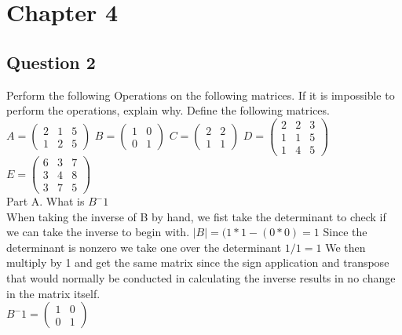 \documentclass[11pt]{article}
\begin{document}
\section{Chapter 4}

\subsection{Question 2}
Perform the following Operations on the following matrices. If it is impossible to perform the operations, explain why. Define the following matrices. \\

$A = \left( \begin{smallmatrix} 2&1&5\\ 1&2&5 \end{smallmatrix} \right)$
$B = \left( \begin{smallmatrix} 1&0\\0&1 \end{smallmatrix} \right)$
$C = \left( \begin{smallmatrix} 2&2\\1&1 \end{smallmatrix} \right)$
$D = \left( \begin{smallmatrix} 2&2&3\\1&1&5\\1&4&5 \end{smallmatrix} \right)$
$E = \left( \begin{smallmatrix} 6&3&7\\3&4&8\\3&7&5 \end{smallmatrix} \right)$\\

Part A. What is $B^-1$\\
	
When taking the inverse of B by hand, we fist take the determinant to check if we can take the inverse to begin with. $|B|=(1*1-(0*0)=1$ Since the determinant is nonzero we take one over the determinant $1/1=1$ We then multiply by 1 and get the same matrix since the sign application and transpose that would normally be conducted in calculating the inverse results in no change in the matrix itself.\\

$B^-1=\left( \begin{smallmatrix} 1&0\\0&1 \end{smallmatrix} \right)$\\
\end{document}
